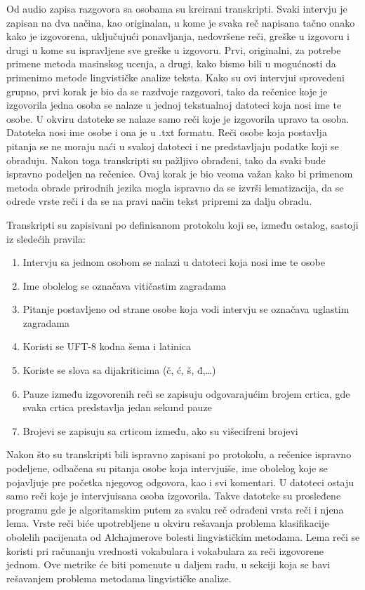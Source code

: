 \documentclass[12pt,oneside]{memoir}
\begin{document}
Od audio zapisa razgovora sa osobama su kreirani transkripti.  Svaki intervju je zapisan na dva načina,  kao originalan,  u kome je svaka reč napisana tačno onako kako je izgovorena,  uključujući ponavljanja,  nedovršene reči,  greške u izgovoru i drugi u kome su ispravljene sve greške u izgovoru.  Prvi,  originalni,  za potrebe primene metoda masinskog ucenja, a drugi, kako bismo bili u mogućnosti da primenimo metode lingvističke analize teksta. Kako su ovi intervjui sprovedeni grupno,  prvi korak je bio da se razdvoje razgovori,  tako da rečenice koje je izgovorila jedna osoba se nalaze u jednoj tekstualnoj datoteci koja nosi ime te osobe.  U okviru datoteke se nalaze samo reči koje je izgovorila upravo ta osoba.  Datoteka nosi ime osobe i ona je u .txt formatu. 
Reči osobe koja postavlja pitanja se ne moraju naći u svakoj datoteci i ne predstavljaju podatke koji se obrađuju.  Nakon toga transkripti su pažljivo obrađeni,  tako da svaki bude ispravno podeljen na rečenice.  Ovaj korak je bio veoma važan kako bi primenom metoda obrade prirodnih jezika mogla ispravno da se izvrši lematizacija,  da se odrede vrste reči i da se na pravi način tekst pripremi za dalju obradu.

Transkripti su zapisivani po definisanom protokolu koji se,  između ostalog,  sastoji iz sledećih pravila:

\begin{enumerate}
\item Intervju sa jednom osobom se nalazi u datoteci koja nosi ime te osobe
\item Ime obolelog se označava vitičastim zagradama 
\item Pitanje postavljeno od strane osobe koja vodi intervju se označava uglastim zagradama
\item Koristi se UFT-8 kodna šema i latinica
\item Koriste se slova sa dijakriticima (č, ć, š, đ,…)
\item Pauze između izgovorenih reči se zapisuju odgovarajućim brojem crtica,  gde svaka crtica predstavlja jedan sekund pauze
\item Brojevi se zapisuju sa crticom između,  ako su višecifreni brojevi
\end{enumerate}

Nakon što su transkripti bili ispravno zapisani po protokolu,  a rečenice ispravno podeljene,  odbačena su pitanja osobe koja intervjuiše,  ime obolelog koje se pojavljuje pre početka njegovog odgovora,  kao i svi komentari.  U datoteci ostaju samo reči koje je intervjuisana osoba izgovorila. 
Takve datoteke su prosleđene programu gde je algoritamskim putem za svaku reč odrađeni vrsta reči i njena lema.  Vrste reči biće upotrebljene u okviru rešavanja problema klasifikacije obolelih pacijenata od Alchajmerove bolesti lingvističkim metodama.  Lema reči se koristi pri računanju vrednosti vokabulara i vokabulara za reči izgovorene jednom.  Ove metrike će biti pomenute u daljem radu, u sekciji koja se bavi rešavanjem problema metodama lingvističke analize. 
\end{document}
